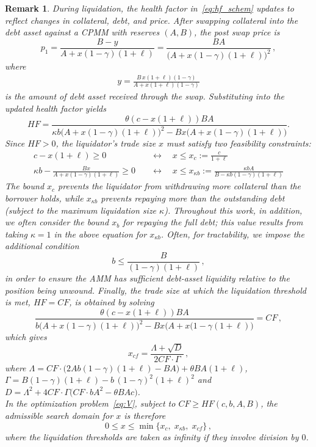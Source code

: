 \documentclass[11pt]{article} %
\newtheorem{remark}{Remark}
\begin{document}
\begin{remark}
During liquidation, the health factor in~\eqref{eq:hf_schem} updates to reflect changes in collateral, debt, and price. After swapping collateral into the debt asset against a CPMM with reserves $(A,B)$, the post swap price is
$$p_1=\frac{B-y}{A+x(1-\gamma)(1+\ell)}=\frac{BA}{\bigl(A+x(1-\gamma)(1+\ell)\bigr)^2}\,,$$
where
\begin{align}
    y=\frac{B\,x(1+\ell)(1-\gamma)}{A+x(1+\ell)(1-\gamma)} \label{eq:y}
\end{align}
is the amount of debt asset received through the swap.
Substituting into the updated health factor yields
\begin{equation}
HF
=
\frac{\theta (c-x(1+\ell))BA}
{\kappa b\bigl(A+x(1-\gamma)(1+\ell)\bigr)^2
 -Bx\bigl(A+x(1-\gamma)(1+\ell)\bigr)}.
\label{eq:hf_fee_remark}
\end{equation}
Since $HF>0$, the liquidator's trade size $x$ must satisfy two feasibility constraints:
\begin{align}
c-x(1+\ell)\ge 0
\quad&\leftrightarrow\quad
x \le x_c := \frac{c}{1+\ell}
\label{eq:xc}\\
\kappa b-\frac{Bx}{A+x(1-\gamma)(1+\ell)}\ge 0
\quad&\leftrightarrow\quad
x \le x_{\kappa b} := \frac{\kappa bA}{B-\kappa b(1-\gamma)(1+\ell)}
\label{eq:xb}
\end{align}
The bound $x_c$ prevents the liquidator from withdrawing more collateral than the borrower holds, while $x_{\kappa b}$ prevents repaying more than the outstanding debt (subject to the maximum liquidation size $\kappa$). Throughout this work, in addition, we often consider the bound $x_b$ for repaying the full debt; this value results from taking $\kappa = 1$ in the above equation for $x_{\kappa b}$.
Often, for tractability, we impose the additional condition
$$b \le \frac{B}{(1-\gamma)(1+\ell)}\,,$$
in order to ensure the AMM has sufficient debt-asset liquidity relative to the position being unwound.
Finally, the trade size at which the liquidation threshold is met, $HF=CF$, is obtained by solving
$$\frac{\theta (c-x(1+\ell))BA}{b\bigl(A+x(1-\gamma)(1+\ell)\bigr)^2-Bx\bigl(A+x(1-\gamma(1+\ell)\bigr)}=CF\,,$$
which gives
\begin{equation}
x_{cf}=\frac{\Lambda + \sqrt{D}}{2CF\cdot\Gamma}\,,
\label{eq:x_cf}
\end{equation}
where $\Lambda=CF\cdot\bigl(2Ab(1-\gamma)(1+\ell)-BA\bigr)+\theta BA(1+\ell)$, $\Gamma=B(1-\gamma)(1+\ell) - b\,(1-\gamma)^2(1+\ell)^2$
and $D=\Lambda^2+4CF\cdot\Gamma\bigl(CF\cdot bA^2-\theta BAc\bigr)$.\\
In the optimization problem~\eqref{eq:V}, subject to $CF \geq HF(c,b,A,B)$, the admissible search domain for $x$ is therefore
$$0 \le x \le \min\{x_c,\;x_{\kappa b},\;x_{cf}\}\,,$$ where the liquidation thresholds are taken as infinity if they involve division by $0$.
\end{remark}
\end{document}
